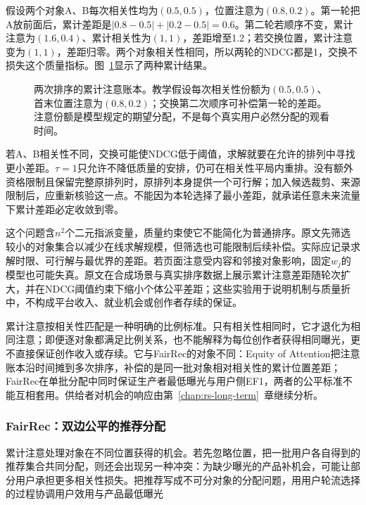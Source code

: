 假设两个对象A、B每次相关性均为$(0.5,0.5)$，位置注意为$(0.8,0.2)$。第一轮把A放前面后，累计差距是$|0.8-0.5|+|0.2-0.5|=0.6$。第二轮若顺序不变，累计注意为$(1.6,0.4)$、累计相关性为$(1,1)$，差距增至1.2；若交换位置，累计注意变为$(1,1)$，差距归零。两个对象相关性相同，所以两轮的NDCG都是1，交换不损失这个质量指标。图~\ref{fig:rs-attention-accounting}显示了两种累计结果。

\begin{figure}[htbp]
 \centering
 
 \caption{两次排序的累计注意账本。教学假设每次相关性份额为$(0.5,0.5)$、首末位置注意为$(0.8,0.2)$；交换第二次顺序可补偿第一轮的差距。注意份额是模型规定的期望分配，不是每个真实用户必然分配的观看时间。}
 \label{fig:rs-attention-accounting}
\end{figure}

若A、B相关性不同，交换可能使NDCG低于阈值，求解就要在允许的排列中寻找更小差距。$\tau=1$只允许不降低质量的安排，仍可在相关性平局内重排。没有额外资格限制且保留完整原排列时，原排列本身提供一个可行解；加入候选裁剪、来源限制后，应重新核验这一点。不能因为本轮选择了最小差距，就承诺任意未来流量下累计差距必定收敛到零。

这个问题含$n^2$个二元指派变量，质量约束使它不能简化为普通排序。原文先筛选较小的对象集合以减少在线求解规模，但筛选也可能限制后续补偿。实际应记录求解时限、可行解与最优界的差距。若页面注意受内容和邻接对象影响，固定$w_j$的模型也可能失真。原文在合成场景与真实排序数据上展示累计注意差距随轮次扩大，并在NDCG阈值约束下缩小个体公平差距；这些实验用于说明机制与质量折中，不构成平台收入、就业机会或创作者存续的保证。

累计注意按相关性匹配是一种明确的比例标准。只有相关性相同时，它才退化为相同注意；即便逐对象都满足比例关系，也不能解释为每位创作者获得相同曝光，更不直接保证创作收入或存续。它与FairRec的对象不同：Equity of Attention把注意账本沿时间摊到多次排序，补偿的是同一批对象相对相关性的累计位置差距；FairRec在单批分配中同时保证生产者最低曝光与用户侧EF1，两者的公平标准不能互相套用。供给者对机会的响应由第~\ref{chap:rs-long-term}~章继续分析。

\subsubsection{FairRec：双边公平的推荐分配}
\label{sec:rs-fairrec}

累计注意处理对象在不同位置获得的机会。若先忽略位置，把一批用户各自得到的推荐集合共同分配，则还会出现另一种冲突：为缺少曝光的产品补机会，可能让部分用户承担更多相关性损失。把推荐写成不可分对象的分配问题，用用户轮流选择的过程协调用户效用与产品最低曝光

